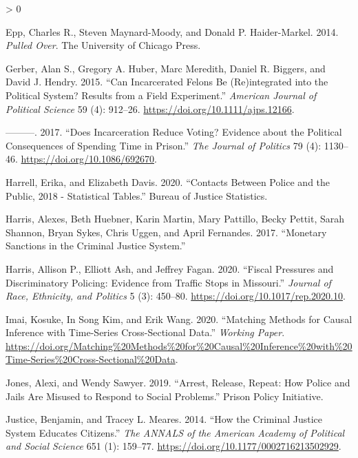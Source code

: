 \documentclass[
  12pt,
]{article}
\newlength{\cslhangindent}
\newenvironment{CSLReferences}[2] %
 {%
  \setlength{\parindent}{0pt}
  \ifodd #1 \everypar{\setlength{\hangindent}{\cslhangindent}}\ignorespaces\fi
  \ifnum #2 > 0
  \setlength{\parskip}{#2\baselineskip}
  \fi
 }%
 {}
\begin{document}
\begin{CSLReferences}{1}{0}
\leavevmode\hypertarget{ref-Epp2014}{}%
Epp, Charles R., Steven Maynard-Moody, and Donald P. Haider-Markel. 2014. \emph{Pulled {Over}}. {The University of Chicago Press}.

\leavevmode\hypertarget{ref-Gerber2015}{}%
Gerber, Alan S., Gregory A. Huber, Marc Meredith, Daniel R. Biggers, and David J. Hendry. 2015. {``Can {Incarcerated Felons Be} ({Re})integrated into the {Political System}? {Results} from a {Field Experiment}.''} \emph{American Journal of Political Science} 59 (4): 912--26. \url{https://doi.org/10.1111/ajps.12166}.

\leavevmode\hypertarget{ref-Gerber2017}{}%
---------. 2017. {``Does {Incarceration Reduce Voting}? {Evidence} about the {Political Consequences} of {Spending Time} in {Prison}.''} \emph{The Journal of Politics} 79 (4): 1130--46. \url{https://doi.org/10.1086/692670}.

\leavevmode\hypertarget{ref-Harrell2020}{}%
Harrell, Erika, and Elizabeth Davis. 2020. {``Contacts {Between Police} and the {Public}, 2018 - {Statistical Tables}.''} {Bureau of Justice Statistics}.

\leavevmode\hypertarget{ref-Harris2017}{}%
Harris, Alexes, Beth Huebner, Karin Martin, Mary Pattillo, Becky Pettit, Sarah Shannon, Bryan Sykes, Chris Uggen, and April Fernandes. 2017. {``Monetary {Sanctions} in the {Criminal Justice System}.''}

\leavevmode\hypertarget{ref-Harris2020}{}%
Harris, Allison P., Elliott Ash, and Jeffrey Fagan. 2020. {``Fiscal {Pressures} and {Discriminatory Policing}: {Evidence} from {Traffic Stops} in {Missouri}.''} \emph{Journal of Race, Ethnicity, and Politics} 5 (3): 450--80. \url{https://doi.org/10.1017/rep.2020.10}.

\leavevmode\hypertarget{ref-Imai2020}{}%
Imai, Kosuke, In Song Kim, and Erik Wang. 2020. {``Matching {Methods} for {Causal Inference} with {Time-Series Cross-Sectional Data}.''} \emph{Working Paper}. \url{https://doi.org/Matching\%20Methods\%20for\%20Causal\%20Inference\%20with\%20Time-Series\%20Cross-Sectional\%20Data}.

\leavevmode\hypertarget{ref-Jones2019}{}%
Jones, Alexi, and Wendy Sawyer. 2019. {``Arrest, Release, Repeat: {How} Police and Jails Are Misused to Respond to Social Problems.''} {Prison Policy Initiative}.

\leavevmode\hypertarget{ref-Justice2014}{}%
Justice, Benjamin, and Tracey L. Meares. 2014. {``How the {Criminal Justice System Educates Citizens}.''} \emph{The ANNALS of the American Academy of Political and Social Science} 651 (1): 159--77. \url{https://doi.org/10.1177/0002716213502929}.


\end{CSLReferences}
\end{document}
